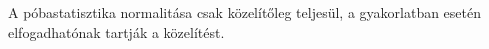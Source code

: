 A póbastatisztika normalitása csak közelítőleg teljesül, a gyakorlatban
esetén elfogadhatónak tartják a közelítést.
